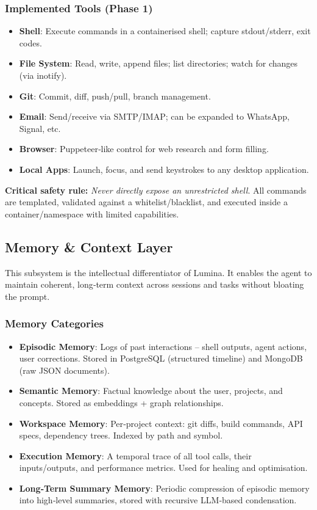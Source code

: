 \documentclass[12pt,a4paper]{article}
\begin{document}
\subsubsection{Implemented Tools (Phase 1)}
\begin{itemize}[leftmargin=*]
    \item \textbf{Shell}: Execute commands in a containerised shell; capture stdout/stderr, exit codes.
    \item \textbf{File System}: Read, write, append files; list directories; watch for changes (via inotify).
    \item \textbf{Git}: Commit, diff, push/pull, branch management.
    \item \textbf{Email}: Send/receive via SMTP/IMAP; can be expanded to WhatsApp, Signal, etc.
    \item \textbf{Browser}: Puppeteer‑like control for web research and form filling.
    \item \textbf{Local Apps}: Launch, focus, and send keystrokes to any desktop application.
\end{itemize}

\textbf{Critical safety rule:} \emph{Never directly expose an unrestricted shell}. All commands are templated, validated against a whitelist/blacklist, and executed inside a container/namespace with limited capabilities.

\subsection{Memory \& Context Layer}
\label{sec:memory}
This subsystem is the intellectual differentiator of Lumina. It enables the agent to maintain coherent, long‑term context across sessions and tasks without bloating the prompt.

\subsubsection{Memory Categories}
\begin{itemize}[leftmargin=*]
    \item \textbf{Episodic Memory}: Logs of past interactions – shell outputs, agent actions, user corrections. Stored in PostgreSQL (structured timeline) and MongoDB (raw JSON documents).
    \item \textbf{Semantic Memory}: Factual knowledge about the user, projects, and concepts. Stored as embeddings + graph relationships.
    \item \textbf{Workspace Memory}: Per‑project context: git diffs, build commands, API specs, dependency trees. Indexed by path and symbol.
    \item \textbf{Execution Memory}: A temporal trace of all tool calls, their inputs/outputs, and performance metrics. Used for healing and optimisation.
    \item \textbf{Long‑Term Summary Memory}: Periodic compression of episodic memory into high‑level summaries, stored with recursive LLM‑based condensation.
\end{itemize}
\end{document}

